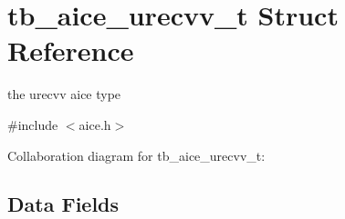 \hypertarget{structtb__aice__urecvv__t}{\section{tb\-\_\-aice\-\_\-urecvv\-\_\-t Struct Reference}
\label{structtb__aice__urecvv__t}
}


the urecvv aice type  




{\ttfamily \#include $<$aice.\-h$>$}



Collaboration diagram for tb\-\_\-aice\-\_\-urecvv\-\_\-t\-:
\subsection*{Data Fields}
